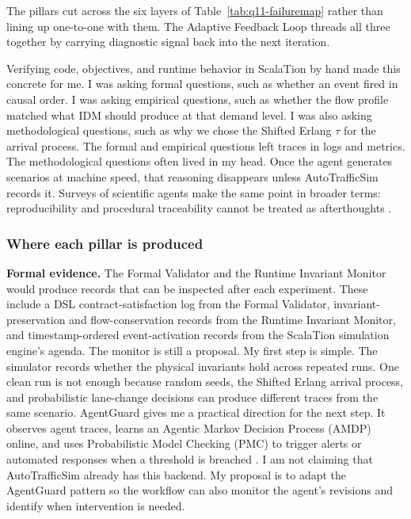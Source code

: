 \begin{bibunit}[plainnat]
The pillars cut across the six layers of Table~\ref{tab:q11-failuremap}
rather than lining up one-to-one with them. The Adaptive Feedback Loop
threads all three together by carrying diagnostic signal back into the next
iteration.

Verifying code, objectives, and runtime behavior in ScalaTion by hand made
this concrete for me. I was asking formal questions, such as whether an event
fired in causal order. I was asking empirical questions, such as whether the
flow profile matched what IDM should produce at that demand level. I was also
asking methodological questions, such as why we chose the Shifted Erlang
$\tau$ for the arrival process. The formal and empirical questions left
traces in logs and metrics. The methodological questions often lived in my
head. Once the agent generates scenarios at machine speed, that reasoning
disappears unless AutoTrafficSim records it. Surveys of scientific agents
make the same point in broader terms: reproducibility and procedural
traceability cannot be treated as afterthoughts
\citep{zhou2025autonomous,ren2503towards}.

\subsubsection{Where each pillar is produced}

\textbf{Formal evidence.} The Formal Validator and the Runtime Invariant
Monitor would produce records that can be inspected after each experiment.
These include a DSL contract-satisfaction log from the Formal Validator,
invariant-preservation and flow-conservation records from the Runtime
Invariant Monitor, and timestamp-ordered event-activation records from the
ScalaTion simulation engine's agenda. The monitor is still a proposal. My
first step is simple. The simulator records whether the physical invariants
hold across repeated runs. One clean run is not enough because random seeds,
the Shifted Erlang arrival process, and probabilistic lane-change decisions
can produce different traces from the same scenario. AgentGuard gives me a
practical direction for the next step. It observes agent traces, learns an
Agentic Markov Decision Process (AMDP) online, and uses Probabilistic Model
Checking (PMC) to trigger alerts or automated responses when a threshold is
breached \citep{koohestani2025agentguard}. I am not claiming that
AutoTrafficSim already has this backend. My proposal is to adapt the
AgentGuard pattern so the workflow can also monitor the agent's revisions
and identify when intervention is needed.


\end{bibunit}
